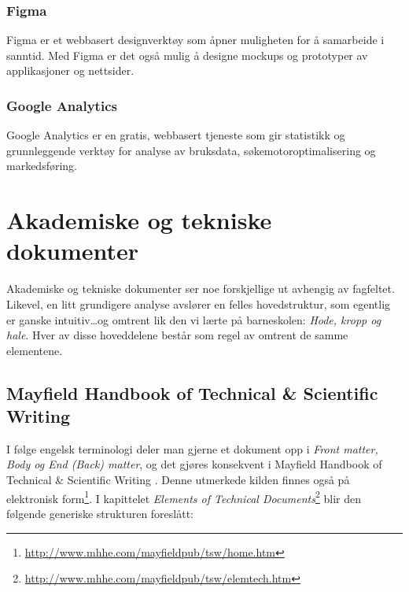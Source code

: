 \subsubsection{Figma}
Figma \cite{figma2019abw} er et webbasert designverktøy som åpner muligheten for å samarbeide i sanntid. Med Figma er det også mulig å designe mockups og prototyper av applikasjoner og nettsider.


\subsubsection{Google Analytics}
\label{sec:google-analytics}
Google Analytics \cite{google2019gtk} er en gratis, webbasert tjeneste som gir statistikk og grunnleggende verktøy for analyse av bruksdata, søkemotoroptimalisering og markedsføring.





\section{Akademiske og tekniske dokumenter}

Akademiske og tekniske dokumenter ser noe forskjellige ut avhengig av fagfeltet. Likevel, en litt grundigere analyse avslører en felles hovedstruktur, som egentlig er ganske intuitiv\dots og omtrent lik den vi lærte på barneskolen: {\em Hode, kropp og hale}. Hver av disse hoveddelene består som regel av omtrent de samme elementene. 



\subsection{Mayfield Handbook of Technical \& Scientific Writing}
\label{sec:mayfield}

I følge engelsk terminologi deler man gjerne et dokument opp i {\em Front matter, Body og End (Back) matter}, og det gjøres konsekvent i
Mayfield Handbook of Technical \& Scientific Writing \cite{perelman97mht}. Denne utmerkede kilden finnes også på 
elektronisk form\footnote{\url{http://www.mhhe.com/mayfieldpub/tsw/home.htm}}. 
I kapittelet 
{\em Elements of Technical Documents}\footnote{\url{http://www.mhhe.com/mayfieldpub/tsw/elemtech.htm}}
blir den følgende generiske strukturen foreslått:

